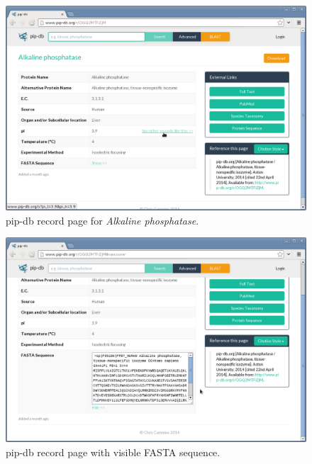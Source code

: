 \begin{figure}[H]
\centering
    \includegraphics[width=\textwidth]{assets/pip-db-record}
\caption[pip-db record page]
        {pip-db record page for \textit{Alkaline phosphatase}.}
\label{fig:pip-db-record}
\end{figure}


\begin{figure}[H]
\centering
    \includegraphics[width=\textwidth]{assets/pip-db-record-fasta}
\caption[pip-db record page FASTA sequence]
        {pip-db record page with visible FASTA sequence.}
\label{fig:pip-db-record-fasta}
\end{figure}


